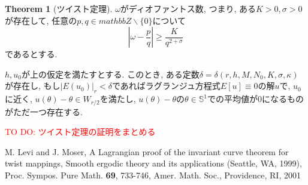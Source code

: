 \documentclass[a4paper]{ujarticle}
\newcommand{\red}[1]{\textcolor{red}{#1}} %
\numberwithin{equation}{section}
\theoremstyle{definition}
\newtheorem{theorem}{Theorem}
\begin{document}
        \begin{theorem}[ツイスト定理]
            $\omega$がディオファントス数, つまり, ある$K > 0, \sigma > 0$が存在して, 
            任意の$p, q \in mathbb{Z} \backslash \{0\}$について
            \begin{equation}
                |\omega - \frac{p}{q}| \geq \frac{K}{q^{2 + \sigma}}
            \end{equation}
            であるとする.

            $h, u_0$が上の仮定を満たすとする. このとき, ある定数$\delta = \delta(r, h, M, N_0, K, \sigma, \kappa)$が存在し,
            もし$|E(u_0)|_r < \delta$であればラグランジュ方程式$E[u] \equiv 0$の解$u$で, $u_0$に近く, $u(\theta) - \theta \in W_{r/2}$を満たし, 
            $u(\theta) - \theta$の$\theta \in \mathbb{S}^1$での平均値が$0$になるものがただ一つ存在する.
        \end{theorem}
        \red{TO DO: ツイスト定理の証明をまとめる}
    \begin{thebibliography}{10}
    \nocite{*}
	  M. Levi and J. Moser, A Lagrangian proof of the invariant curve theorem for twist mappings, 
    Smooth ergodic theory and its applications (Seattle, WA, 1999), Proc. Sympos. Pure Math. \textbf{69}, 733-746, Amer. Math. Soc., Providence, RI, 2001 
\end{thebibliography}
\end{document}
